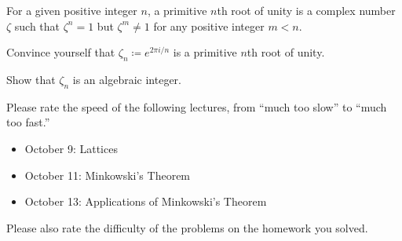 \documentclass[../notes.tex]{subfiles}
\begin{document}
\begin{prob}[5 points]
	For a given positive integer $n$, a primitive $n$th root of unity is a complex number $\zeta$ such that $\zeta^n=1$ but $\zeta^m\ne1$ for any positive integer $m<n$.
	\begin{listalph}
		\item Convince yourself that $\zeta_n\coloneqq e^{2\pi i/n}$ is a primitive $n$th root of unity.
		\item Show that $\zeta_n$ is an algebraic integer.
	\end{listalph}
\end{prob}
\begin{prob}[0 points]
	Please rate the speed of the following lectures, from ``much too slow'' to ``much too fast.''
	\begin{itemize}
		\item October 9: Lattices
		\item October 11: Minkowski's Theorem
		\item October 13: Applications of Minkowski's Theorem
	\end{itemize}
	Please also rate the difficulty of the problems on the homework you solved.
\end{prob}
\end{document}

